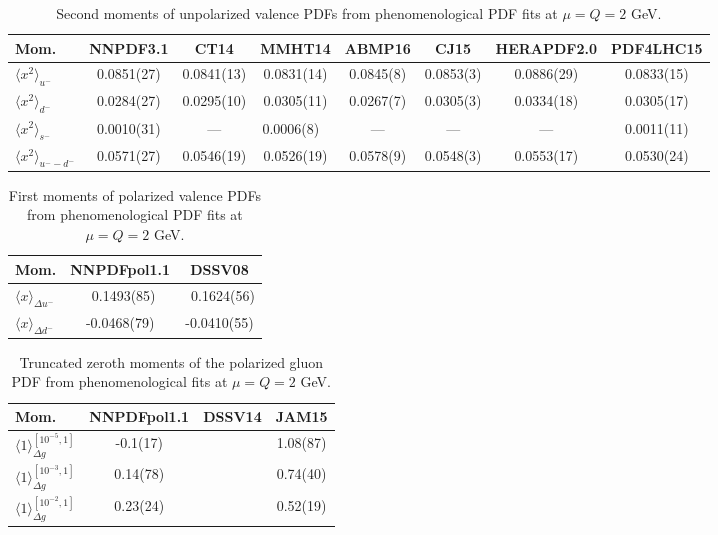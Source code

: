 \begin{table}[!b]
\centering
\small
\begin{tabular}{lccccccc}
\toprule
Mom. & NNPDF3.1 & CT14 & MMHT14 & ABMP16 & CJ15 & HERAPDF2.0 & PDF4LHC15 \\
\midrule
$\langle x^2\rangle_{u^-}$ 
& 0.0851(27) & 0.0841(13) & 0.0831(14)    
& 0.0845(8) & 0.0853(3) & 0.0886(29) & 0.0833(15) \\
$\langle x^2\rangle_{d^-}$
& 0.0284(27) & 0.0295(10) & 0.0305(11)    
& 0.0267(7) & 0.0305(3) & 0.0334(18) & 0.0305(17) \\ 
$\langle x^2\rangle_{s^-}$
& 0.0010(31) & ---        & 0.0006(8)\ \, 
& ---       & ---       & ---        & 0.0011(11) \\
$\langle x^2\rangle_{u^--d^-}$
& 0.0571(27) & 0.0546(19) & 0.0526(19)    
& 0.0578(9) & 0.0548(3) & 0.0553(17) & 0.0530(24) \\
\bottomrule
\end{tabular}
\caption{\small Second moments of unpolarized valence PDFs from 
phenomenological PDF fits at $\mu=Q=2$ GeV.}
\label{tab:unpHmoms}
\end{table}

\begin{table}[!b]
\centering
\footnotesize
\begin{tabular}{lcc}
\toprule
Mom. & NNPDFpol1.1 & DSSV08 \\
\midrule
$\langle x\rangle_{\Delta u^-}$ 
& \ 0.1493(85) & \ 0.1624(56) \\
$\langle x\rangle_{\Delta d^-}$ 
&  -0.0468(79) &  -0.0410(55) \\
\bottomrule
\end{tabular}
\caption{\small First moments of polarized valence PDFs from phenomenological 
PDF fits at $\mu=Q=2$ GeV.}
\label{tab:polHmoms}
\end{table}

\begin{table}[!b]
\centering
\footnotesize
\begin{tabular}{lccc}
\toprule
Mom. & NNPDFpol1.1 & DSSV14 & JAM15\\
\midrule
$\langle 1\rangle_{\Delta g}^{[10^{-5},1]}$  
& -0.1(17) & & 1.08(87) \\
$\langle 1\rangle_{\Delta g}^{[10^{-3},1]}$  
& 0.14(78) & & 0.74(40) \\
$\langle 1\rangle_{\Delta g}^{[10^{-2},1]}$  
& 0.23(24) & & 0.52(19) \\
\bottomrule
\end{tabular}
\caption{\small Truncated zeroth moments of the polarized gluon PDF from 
phenomenological fits at $\mu=Q=2$ GeV.}
\label{tab:polgmom}
\end{table}
